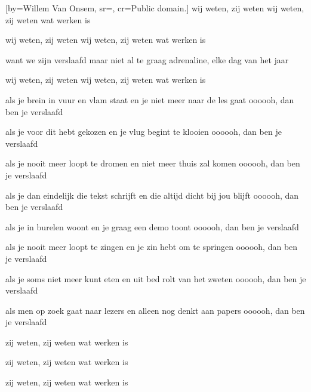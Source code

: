 [by={Willem Van Onsem},
sr={},
cr={Public domain.}]
\beginchorus
wij weten, zij weten
wij weten, zij weten
wat werken is

wij weten, zij weten
wij weten, zij weten
wat werken is

want we zijn verslaafd
maar niet al te graag
adrenaline, elke dag van het jaar

wij weten, zij weten
wij weten, zij weten
wat werken is
\endchorus

\beginverse
als je brein in vuur en vlam staat
en je niet meer naar de les gaat
oooooh, dan ben je verslaafd

als je voor dit hebt gekozen
en je vlug begint te klooien
oooooh, dan ben je verslaafd

als je nooit meer loopt te dromen
en niet meer thuis zal komen
oooooh, dan ben je verslaafd

als je dan eindelijk die tekst schrijft
en die altijd dicht bij jou blijft
oooooh, dan ben je verslaafd
\endverse

\beginverse
als je in burelen woont
en je graag een demo toont
oooooh, dan ben je verslaafd

als je nooit meer loopt te zingen
en je zin hebt om te springen
oooooh, dan ben je verslaafd

als je soms niet meer kunt eten
en uit bed rolt van het zweten
oooooh, dan ben je verslaafd

als men op zoek gaat naar lezers
en alleen nog denkt aan papers
oooooh, dan ben je verslaafd
\endverse

\beginverse
zij weten, zij weten
wat werken is

zij weten, zij weten
wat werken is

zij weten, zij weten
wat werken is
\endverse

\endsong